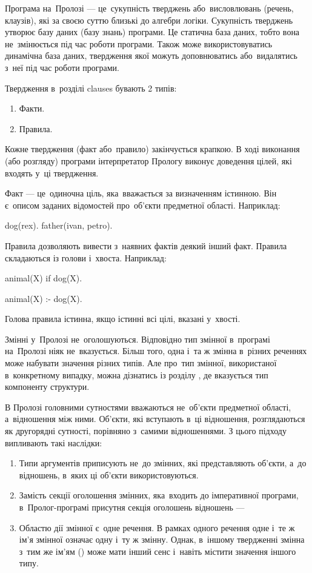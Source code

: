 \documentclass[
	a4paper,
	oneside,
	BCOR = 10mm,
	DIV = 12,
	12pt,
	headings = normal,
]{scrartcl}
\begin{document}
		Програма на~Пролозі — це~сукупність тверджень або~висловлювань (речень, клаузів), які за своєю суттю близькі до алгебри логіки. Сукупність тверджень утворює базу даних (базу знань) програми. Це статична база даних, тобто вона не~змінюється під час роботи програми. Також може використовуватись динамічна база даних, твердження якої можуть доповнюватись або~видалятись з~неї під час роботи програми. 

		Твердження в~розділі clauses бувають 2 типів:
		\begin{enumerate}
			\item Факти. 
			\item Правила. 
		\end{enumerate}

		Кожне твердження (факт або~правило) закінчується крапкою. В ході виконання (або розгляду) програми інтерпретатор Прологу виконує доведення цілей, які входять у~ці твердження. 

		Факт — це~одиночна ціль, яка~вважається за визначенням істинною. Він є~описом заданих відомостей про~об'єкти предметної області. Наприклад:
		\begin{prologcode}
			dog(rex).
			father(ivan, petro).
		\end{prologcode}
		Правила дозволяють вивести з~наявних фактів деякий інший факт. Правила складаються із голови і~хвоста. Наприклад:
		\begin{prologcode}
		animal(X) if dog(X).

		animal(X) :- dog(X).
		\end{prologcode}

		Голова правила істинна, якщо істинні всі цілі, вказані у~хвості. 

		Змінні у~Пролозі не~оголошуються. Відповідно тип змінної в~програмі на~Пролозі ніяк не~вказується. Більш того, одна і~та ж змінна в~різних реченнях може набувати значення різних типів. Але про~тип змінної, використаної в~конкретному випадку, можна дізнатись із розділу , де вказується тип компоненту структури. 

		В Пролозі головними сутностями вважаються не~об'єкти предметної області, а~відношення між ними. Об'єкти, які вступають в~ці відношення, розглядаються як другорядні сутності, порівняно з~самими відношеннями. З цього підходу випливають такі наслідки:
		\begin{enumerate}
			\item Типи аргументів приписують не~до змінних, які представляють об'єкти, а~до відношень, в~яких ці об'єкти використовуються. 
			\item Замість секції оголошення змінних, яка~входить до імперативної програми, в~Пролог-програмі присутня секція оголошень відношень —  
			\item Областю дії змінної є~одне речення. В рамках одного речення одне і~те ж ім'я змінної означає одну і~ту ж змінну. Однак, в~іншому твердженні змінна з~тим же ім'ям () може мати інший сенс і~навіть містити значення іншого типу. 
		\end{enumerate}
\end{document}
